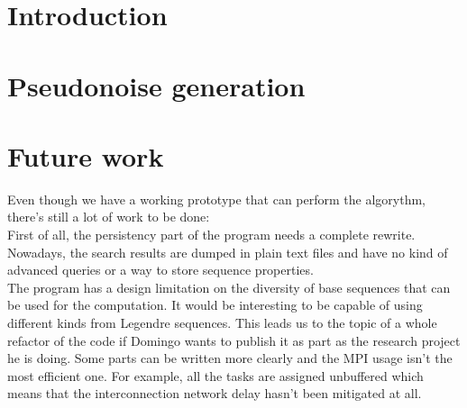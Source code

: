 \documentclass{tfg_domingo}
\begin{document}

\portada
\frontmatter
\gracias{}
\resumen{}{}
\tableofcontents

\mainmatter


\chapter{Introduction}



\chapter{Pseudonoise generation}











\chapter{Future work}

  Even though we have a working prototype that can perform the algorythm,
  there's still a lot of work to be done:\\

  First of all, the persistency part of the program needs a complete rewrite.
  Nowadays, the search results are dumped in plain text files and have no
  kind of advanced queries or a way to store sequence properties.\\

  The program has a design limitation on the diversity of base sequences
  that can be used for the computation. It would be interesting to be capable
  of using different kinds from Legendre sequences. This leads us to the topic
  of a whole refactor of the code if Domingo wants to publish it as part as
  the research project he is doing. Some parts can be written more clearly
  and the MPI usage isn't the most efficient one. For example, all the tasks
  are assigned unbuffered which means that the interconnection network delay
  hasn't been mitigated at all.\\
\end{document}
